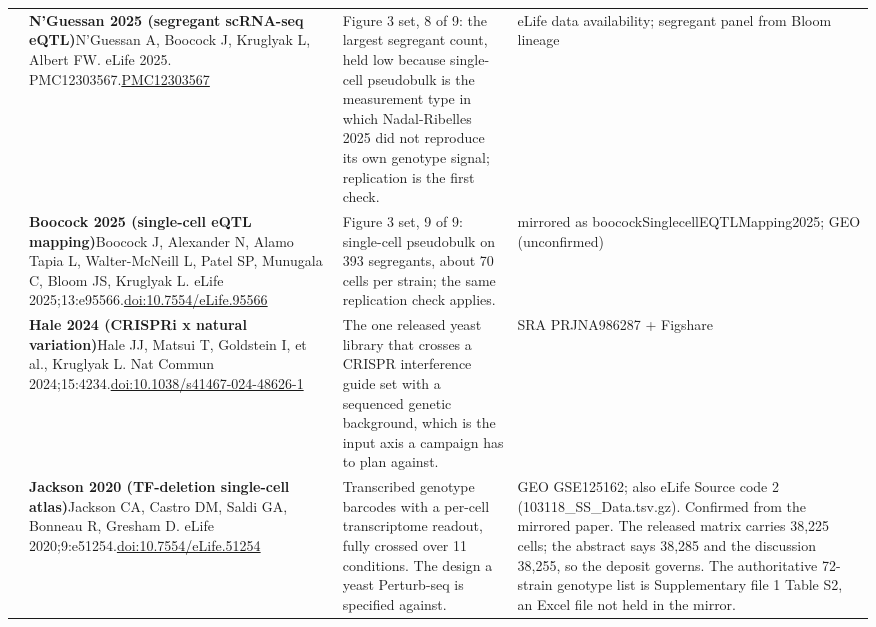 \begin{landscape}
\begin{longtable}{@{}r@{\hspace{4pt}} L{86mm} L{92mm} L{62mm}@{}}
 & \textbf{N'Guessan 2025 (segregant scRNA-seq eQTL)}\newline N'Guessan A, Boocock J, Kruglyak L, Albert FW. eLife 2025. PMC12303567.\newline \href{https://pmc.ncbi.nlm.nih.gov/articles/PMC12303567/}{PMC12303567} & Figure 3 set, 8 of 9: the largest segregant count, held low because single-cell pseudobulk is the measurement type in which Nadal-Ribelles 2025 did not reproduce its own genotype signal; replication is the first check. & eLife data availability; segregant panel from Bloom lineage \\
 & \textbf{Boocock 2025 (single-cell eQTL mapping)}\newline Boocock J, Alexander N, Alamo Tapia L, Walter-McNeill L, Patel SP, Munugala C, Bloom JS, Kruglyak L. eLife 2025;13:e95566.\newline \href{https://doi.org/10.7554/eLife.95566}{doi:10.7554/\allowbreak eLife.95566} & Figure 3 set, 9 of 9: single-cell pseudobulk on 393 segregants, about 70 cells per strain; the same replication check applies. & mirrored as boocockSinglecellEQTLMapping2025; GEO (unconfirmed) \\
 & \textbf{Hale 2024 (CRISPRi x natural variation)}\newline Hale JJ, Matsui T, Goldstein I, et al., Kruglyak L. Nat Commun 2024;15:4234.\newline \href{https://doi.org/10.1038/s41467-024-48626-1}{doi:10.1038/\allowbreak s41467-024-48626-1} & The one released yeast library that crosses a CRISPR interference guide set with a sequenced genetic background, which is the input axis a campaign has to plan against. & SRA PRJNA986287 + Figshare \\
 & \textbf{Jackson 2020 (TF-deletion single-cell atlas)}\newline Jackson CA, Castro DM, Saldi GA, Bonneau R, Gresham D. eLife 2020;9:e51254.\newline \href{https://doi.org/10.7554/eLife.51254}{doi:10.7554/\allowbreak eLife.51254} & Transcribed genotype barcodes with a per-cell transcriptome readout, fully crossed over 11 conditions. The design a yeast Perturb-seq is specified against. & GEO GSE125162; also eLife Source code 2 (103118\_SS\_Data.tsv.gz). Confirmed from the mirrored paper. The released matrix carries 38,225 cells; the abstract says 38,285 and the discussion 38,255, so the deposit governs. The authoritative 72-strain genotype list is Supplementary file 1 Table S2, an Excel file not held in the mirror. \\

\end{longtable}
\end{landscape}
